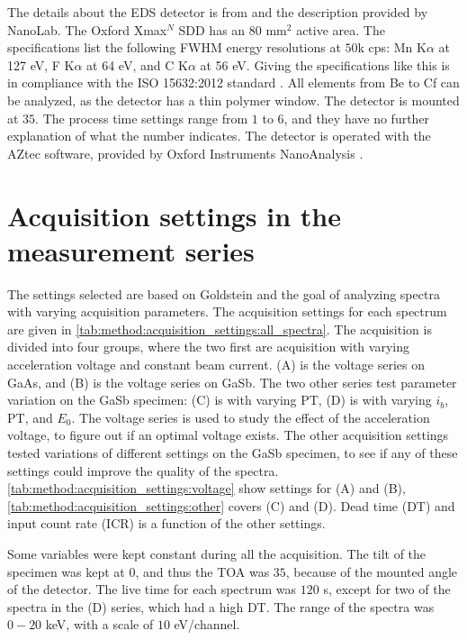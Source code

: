 The details about the EDS detector is from \cite{xmaxn_datasheet} and the description provided by NanoLab.
The Oxford Xmax$^N$ SDD has an $80$ mm$^2$ active area. %
The specifications list the following FWHM energy resolutions at $50$k cps: Mn K$\alpha$ at 127 eV, F  K$\alpha$ at 64 eV, and C  K$\alpha$ at 56 eV.
Giving the specifications like this is in compliance with the ISO 15632:2012 standard \cite{iso_qc_15632}.
All elements from Be to Cf can be analyzed, as the detector has a thin polymer window.
The detector is mounted at $35$\textdegree.
The process time settings range from $1$ to $6$, and they have no further explanation of what the number indicates.
The detector is operated with the AZtec software, provided by Oxford Instruments NanoAnalysis \cite{aztec_manual}.



\section{Acquisition settings in the measurement series}
\label{method:acquisition_settings}

The settings selected are based on Goldstein \cite{goldstein_scanning_2018} and the goal of analyzing spectra with varying acquisition parameters.
The acquisition settings for each spectrum are given in \cref{tab:method:acquisition_settings:all_spectra}.
The acquisition is divided into four groups, where the two first are acquisition with varying acceleration voltage and constant beam current.
(A) is the voltage series on GaAs, and (B) is the voltage series on GaSb.
The two other series test parameter variation on the GaSb specimen: (C) is with varying PT, (D) is with varying $i_b$, PT, and $E_0$.
The voltage series is used to study the effect of the acceleration voltage, to figure out if an optimal voltage exists.
The other acquisition settings tested variations of different settings on the GaSb specimen, to see if any of these settings could improve the quality of the spectra.
\cref{tab:method:acquisition_settings:voltage} show settings for (A) and (B), \cref{tab:method:acquisition_settings:other} covers (C) and (D).
Dead time (DT) and input count rate (ICR) is a function of the other settings.


Some variables were kept constant during all the acquisition.
The tilt of the specimen was kept at $0$\textdegree, and thus the TOA was $35$\textdegree, because of the mounted angle of the detector.
The live time for each spectrum was $120$ s, except for two of the spectra in the (D) series, which had a high DT.
The range of the spectra was $0-20$ keV, with a scale of $10$ eV/channel.

